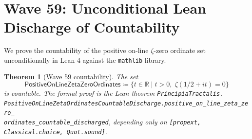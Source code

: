 \documentclass[11pt,a4paper]{amsart}
\theoremstyle{plain}
\newtheorem{theorem}{Theorem}[section]
\theoremstyle{definition}
\begin{document}
\section{Wave 59: Unconditional Lean Discharge of Countability}\label{sec:wave59}

We prove the countability of the positive on-line $\zeta$-zero ordinate set unconditionally in Lean 4 against the \texttt{mathlib} library.

\begin{theorem}[Wave 59 countability]\label{thm:wave59}
The set
\[
\textsf{PositiveOnLineZetaZeroOrdinates} \coloneqq \{t \in \mathbb{R} \mid t > 0,\;\zeta(1/2 + it) = 0\}
\]
is countable. The formal proof is the Lean theorem \texttt{PrincipiaTractalis.\\PositiveOnLineZetaOrdinatesCountableDischarge.positive\_on\_line\_zeta\_zero\_\\ordinates\_countable\_discharged}, depending only on \texttt{[propext, Classical.choice, Quot.sound]}.
\end{theorem}
\end{document}
